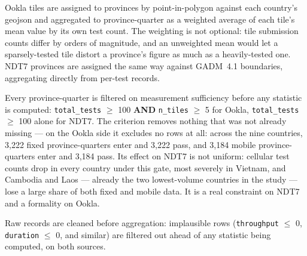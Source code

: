 \documentclass[sigconf]{acmart}
\begin{document}
Ookla tiles are assigned to provinces by point-in-polygon against each country's geojson
and aggregated to province-quarter as a weighted average of each tile's mean value by its
own test count. The weighting is not optional: tile submission counts differ by orders of
magnitude, and an unweighted mean would let a sparsely-tested tile distort a province's
figure as much as a heavily-tested one. NDT7 provinces are assigned the same way against
GADM~4.1 boundaries, aggregating directly from per-test records.

Every province-quarter is filtered on measurement sufficiency before any statistic is
computed: \texttt{total\_tests} $\geq$ 100 \textbf{AND} \texttt{n\_tiles} $\geq$ 5 for
Ookla, \texttt{total\_tests} $\geq$ 100 alone for NDT7. The criterion removes nothing that
was not already missing --- on the Ookla side it excludes no rows at all: across the nine
countries, 3{,}222 fixed province-quarters enter and 3{,}222 pass, and 3{,}184 mobile
province-quarters enter and 3{,}184 pass. Its effect on NDT7 is not uniform: cellular test
counts drop in every country under this gate, most severely in Vietnam, and Cambodia and
Laos --- already the two lowest-volume countries in the study --- lose a large share of
both fixed and mobile data. It is a real constraint on NDT7 and a formality on Ookla.

Raw records are cleaned before aggregation: implausible rows (\texttt{throughput} $\leq$ 0,
\texttt{duration} $\leq$ 0, and similar) are filtered out ahead of any statistic being
computed, on both sources.
\end{document}
